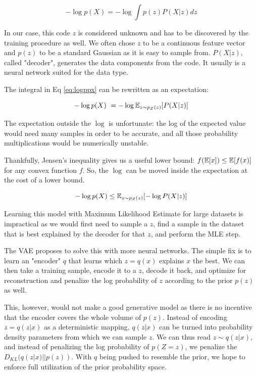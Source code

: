 \begin{equation}
\label{eq:logppx}
    - \log p(X) = - \log \int p(z) P(X | z) dz
\end{equation}

In our case, this code $z$ is considered unknown and has to be discovered by the training procedure as well. We often chose $z$ to be a continuous feature vector and $p(z)$ to be a standard Gaussian as it is easy to sample from. $P(X | z)$, called "decoder", generates the data components from the code. It usually is a neural network suited for the data type.

The integral in Eq \ref{eq:logppx} can be rewritten as an expectation: 

\begin{equation}
    - \log p(X) ~= - \log \mathbb{E}_{z \sim p_Z(z)}[P(X| z)]
\end{equation}

The expectation outside the $\log$ is unfortunate: the log of the expected value would need many samples in order to be accurate, and all those probability multiplications would be numerically unstable.

Thankfully, Jensen's inequality gives us a useful lower bound: $f(\mathbb{E}[x]) \leq \mathbb{E}[f(x)]$ for any convex function $f$. So, the $\log$ can be moved inside the expectation at the cost of a lower bound.

\begin{equation}
    - \log p(X) \leq \mathbb{E}_{z \sim p_Z(z)} [- \log  P(X | z) ]
\end{equation}

Learning this model with Maximum Likelihood Estimate for large datasets is impractical as we would first need to sample a $z$, find a sample in the dataset that is best explained by the decoder for that $z$, and perform the MLE step.

The VAE \citep{vae} proposes to solve this with more neural networks. The simple fix is to learn an "encoder" $q$ that learns which $z = q(x)$ explains $x$ the best. We can then take a training sample, encode it to a $z$, decode it back, and optimize for reconstruction and penalize the log probability of $z$ according to the prior $p(z)$ as well.

This, however, would not make a good generative model as there is no incentive that the encoder covers the whole volume of $p(z)$. Instead of encoding $z = q(z|x)$ as a deterministic mapping, $q(z|x)$ can be turned into probability density parameters from which we can sample $z$. We can thus read $z \sim q(z|x)$, and instead of penalizing the log probability of $p(Z=z)$, we penalize the $D_{KL}(q(z|x) || p(z))$. With $q$ being pushed to resemble the prior, we hope to enforce full utilization of the prior probability space.

